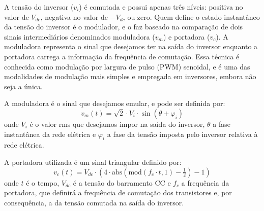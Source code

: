 
A tensão do inversor ($v_i$) é comutada e possui apenas três níveis: positiva no valor de $V_{dc}$, negativa no valor
de $-V_{dc}$ ou zero.
Quem define o estado instantâneo da tensão do inversor é o modulador, e o faz baseado na comparação de dois sinais
intermediários denominados moduladora ($v_m$) e portadora ($v_c$).
A moduladora representa o sinal que desejamos ter na saída do inversor enquanto a portadora carrega a
informação da frequência de comutação.
Essa técnica é conhecida como modulação por largura de pulso (PWM) senoidal, e é uma das modalidades de modulação mais
simples e empregada em inversores, embora não seja a única.

A moduladora é o sinal que desejamos emular, e pode ser definida por:
\begin{equation}
    v_m(t) = \sqrt{2} \cdot V_i \cdot \sin(\theta + \varphi_i)
\end{equation}
onde $V_i$ é o valor rms que desejamos impor na saída do inversor, $\theta$ a fase instantânea da rede elétrica e
$\varphi_i$ a fase da tensão imposta pelo inversor relativa à rede elétrica.

A portadora utilizada é um sinal triangular definido por:
\begin{equation}
    \label{eq:c}
    v_c(t) = V_{dc} \cdot \left( 4 \cdot \text{abs}\! \left( \text{mod} (f_c \cdot t, 1) - \tfrac{1}{2} \right)   -1 \right)
\end{equation}
onde $t$ é o tempo,  $V_{dc}$ é a tensão do barramento CC e $f_c$ a frequência da portadora, que definirá a frequência de comutação
dos transistores e, por consequência, a da tensão comutada na saída do inversor.

